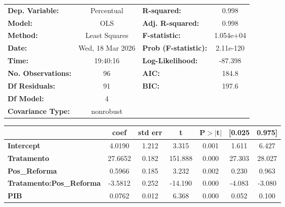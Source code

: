 \begin{center}
\begin{tabular}{lclc}
\toprule
\textbf{Dep. Variable:}          &    Percentual    & \textbf{  R-squared:         } &     0.998   \\
\textbf{Model:}                  &       OLS        & \textbf{  Adj. R-squared:    } &     0.998   \\
\textbf{Method:}                 &  Least Squares   & \textbf{  F-statistic:       } & 1.054e+04   \\
\textbf{Date:}                   & Wed, 18 Mar 2026 & \textbf{  Prob (F-statistic):} & 2.11e-120   \\
\textbf{Time:}                   &     19:40:16     & \textbf{  Log-Likelihood:    } &   -87.398   \\
\textbf{No. Observations:}       &          96      & \textbf{  AIC:               } &     184.8   \\
\textbf{Df Residuals:}           &          91      & \textbf{  BIC:               } &     197.6   \\
\textbf{Df Model:}               &           4      & \textbf{                     } &             \\
\textbf{Covariance Type:}        &    nonrobust     & \textbf{                     } &             \\
\bottomrule
\end{tabular}
\begin{tabular}{lcccccc}
                                 & \textbf{coef} & \textbf{std err} & \textbf{t} & \textbf{P$> |$t$|$} & \textbf{[0.025} & \textbf{0.975]}  \\
\midrule
\textbf{Intercept}               &       4.0190  &        1.212     &     3.315  &         0.001        &        1.611    &        6.427     \\
\textbf{Tratamento}              &      27.6652  &        0.182     &   151.888  &         0.000        &       27.303    &       28.027     \\
\textbf{Pos\_Reforma}            &       0.5966  &        0.185     &     3.232  &         0.002        &        0.230    &        0.963     \\
\textbf{Tratamento:Pos\_Reforma} &      -3.5812  &        0.252     &   -14.190  &         0.000        &       -4.083    &       -3.080     \\
\textbf{PIB}                     &       0.0762  &        0.012     &     6.368  &         0.000        &        0.052    &        0.100     \\

\end{tabular}
\end{center}
